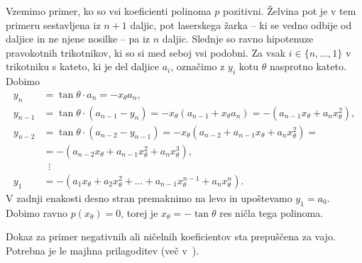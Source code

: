 \begin{dokaz}
    Vzemimo primer, ko so vsi koeficienti polinoma $p$ pozitivni. Želvina pot je v tem primeru sestavljena iz $n+1$ daljic, pot laserskega žarka -- ki se vedno odbije od daljice in ne njene nosilke -- pa iz $n$ daljic. Slednje so ravno hipotenuze pravokotnih trikotnikov, ki so si med seboj vsi podobni. Za vsak $i \in \{n, \ldots, 1\}$ v trikotniku s kateto, ki je del daljice $a_i$, označimo z $y_i$ kotu $\theta$ nasprotno kateto. Dobimo
    \begin{align*}
        y_n &= \tan \theta \cdot a_n = - x_{\theta} a_n, \\
        y_{n-1} &= \tan \theta \cdot (a_{n-1} - y_n) = - x_{\theta} (a_{n-1} + x_{\theta} a_n) = - (a_{n-1} x_{\theta} + a_n x_{\theta}^2),\\
        y_{n-2} &= \tan \theta \cdot (a_{n-2} - y_{n-1}) = - x_{\theta} (a_{n-2} + a_{n-1} x_{\theta} + a_n x_{\theta}^2) = \\
        &= - (a_{n-2} x_{\theta} + a_{n-1} x_{\theta}^2 + a_n x_{\theta}^3), \\
        & \; \; \vdots \\
        y_1 &= - (a_1 x_{\theta} + a_2 x_{\theta}^2 + \ldots + a_{n-1} x_{\theta}^{n-1} + a_n x_{\theta}^n).
    \end{align*}
    V zadnji enakosti desno stran premaknimo na levo in upoštevamo $y_1 = a_0$. Dobimo ravno $p(x_{\theta}) = 0$, torej je $x_{\theta} = - \tan \theta$ res ničla tega polinoma.

    Dokaz za primer negativnih ali ničelnih koeficientov sta prepuščena za vajo. Potrebna je le majhna prilagoditev (več v~\cite[str.\ 36]{zore2022}).
\end{dokaz}

